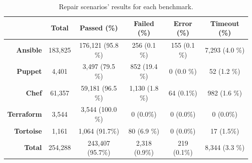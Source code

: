 \begin{table}
    \centering
    \caption{Repair scenarios' results for each benchmark.}
    \label{tab:test_results}
    \scriptsize
    \begin{tabular}{rccccc}
        \toprule
                 & \textbf{Total} & \textbf{Passed (\%)} & \textbf{Failed (\%)} & \textbf{Error (\%)} & \textbf{Timeout (\%)}  \\
        \toprule
         \textbf{Ansible}  & 183,825 & 176,121 (95.8 \%)  & 256 (0.1 \%)    & 155 (0.1 \%) &  7,293 (4.0 \%) \\
         \textbf{Puppet}   & 4,401   & 3,497 (79.5 \%)    & 852 (19.4 \%)   & 0 (0.0 \%)   & 52 (1.2 \%) \\
         \textbf{Chef}     & 61,357  & 59,181 (96.5 \%)   & 1,130 (1.8 \%)  & 64 (0.1\%)   & 982 (1.6 \%) \\
         \textbf{Terraform}& 3,544   & 3,544 (100.0 \%) & 0 (0.0\%) & 0 (0.0\%) & 0 (0.0\%) \\
         \textbf{Tortoise} & 1,161   & 1,064 (91.7\%)     & 80 (6.9 \%)    & 0 (0.0\%)    & 17 (1.5\%) \\
        \midrule
         \textbf{Total}    & 254,288 & 243,407 (95.7\%)   & 2,318 (0.9\%)   & 219 (0.1\%) & 8,344 (3.3 \%) \\
        \bottomrule
    \end{tabular}
\end{table}